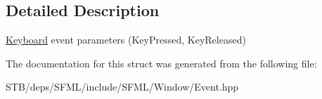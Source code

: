 \subsection{Detailed Description}
\hyperlink{classsf_1_1_keyboard}{Keyboard} event parameters (Key\+Pressed, Key\+Released) 

The documentation for this struct was generated from the following file\+:\begin{DoxyCompactItemize}
\item 
S\+T\+B/deps/\+S\+F\+M\+L/include/\+S\+F\+M\+L/\+Window/Event.\+hpp\end{DoxyCompactItemize}

